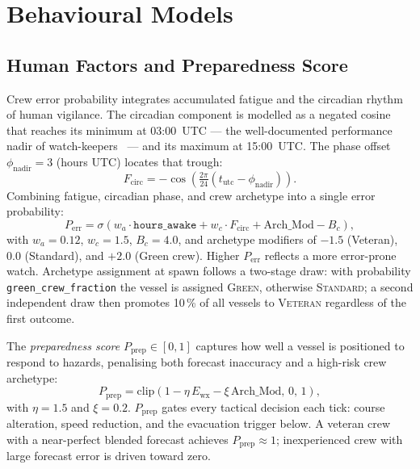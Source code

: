 \documentclass[cameraready]{Interspeech}
\begin{document}
\section{Behavioural Models}
\label{sec:behaviour}

\subsection{Human Factors and Preparedness Score}

Crew error probability integrates accumulated fatigue and the circadian rhythm of human vigilance. The circadian component is modelled as a negated cosine that reaches its minimum at 03:00~UTC — the well-documented performance nadir of watch-keepers~\cite{chauvin2013} — and its maximum at 15:00~UTC. The phase offset $\phi_\text{nadir} = 3$ (hours UTC) locates that trough:
%
\begin{equation}
  F_\text{circ} = -\cos\left(\tfrac{2\pi}{24}
                  (t_\text{utc} - \phi_\text{nadir})\right).
  \label{eq:circadian}
\end{equation}
%
Combining fatigue, circadian phase, and crew archetype into a single error probability:
%
\begin{equation}
  P_\text{err} = \sigma\left(
    w_a\cdot\texttt{hours\_awake}
    + w_c\cdot F_\text{circ}
    + \text{Arch\_Mod} - B_c
  \right),
  \label{eq:Perr}
\end{equation}
%
with $w_a = 0.12$, $w_c = 1.5$, $B_c = 4.0$, and archetype modifiers of $-1.5$ (Veteran), $0.0$ (Standard), and $+2.0$ (Green crew). Higher $P_\text{err}$ reflects a more error-prone watch. Archetype assignment at spawn follows a two-stage draw: with probability \texttt{green\_crew\_fraction} the vessel is assigned \textsc{Green}, otherwise \textsc{Standard}; a second independent draw then promotes 10\,\% of all vessels to \textsc{Veteran} regardless of the first outcome.

The \emph{preparedness score} $P_\text{prep} \in [0,1]$ captures how well a vessel is positioned to respond to hazards, penalising both forecast inaccuracy and a high-risk crew archetype:
%
\begin{equation}
  P_\text{prep} = \text{clip}\left(
    1 - \eta\,E_\text{wx} - \xi\,\text{Arch\_Mod},\,0,\,1
  \right),
  \label{eq:Pprep}
\end{equation}
%
with $\eta = 1.5$ and $\xi = 0.2$. $P_\text{prep}$ gates every tactical decision each tick: course alteration, speed reduction, and the evacuation trigger below. A veteran crew with a near-perfect blended forecast achieves $P_\text{prep} \approx 1$; inexperienced crew with large forecast error is driven toward zero.
\end{document}
